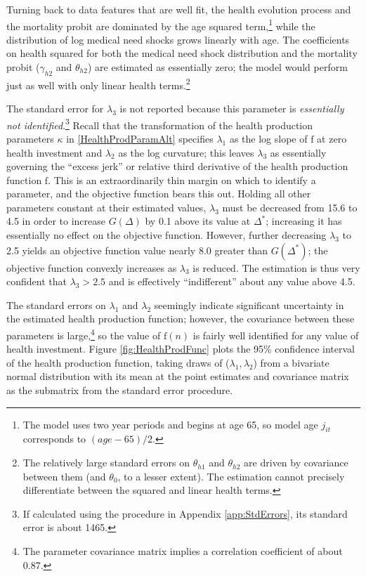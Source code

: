 \documentclass[12pt,pdftex,letterpaper]{article}
\newcommand{\Health}{h}
\newcommand{\Invst}{n}
\newcommand{\MedShkParam}{\gamma}
\newcommand{\Age}{j}
\newcommand{\MortParam}{\theta}
\newcommand{\HealthProdFunc}{\text{f}}
\newcommand{\HealthProdParam}{\kappa}
\newcommand{\HealthProdParamAlt}{\lambda}
\begin{document}
Turning back to data features that are well fit, the health evolution process and the mortality probit are dominated by the age squared term,\footnote{The model uses two year periods and begins at age 65, so model age $\Age_{it}$ corresponds to $(age - 65)/2$.} while the distribution of log medical need shocks grows linearly with age.  The coefficients on health squared for both the medical need shock distribution and the mortality probit ($\MedShkParam_{\Health 2}$ and $\MortParam_{\Health 2}$) are estimated as essentially zero; the model would perform just as well with only linear health terms.\footnote{The relatively large standard errors on $\MortParam_{\Health 1}$ and $\MortParam_{\Health 2}$ are driven by covariance between them (and $\MortParam_0$, to a lesser extent).  The estimation cannot precisely differentiate between the squared and linear health terms.}

The standard error for $\HealthProdParamAlt_3$ is not reported because this parameter is \textit{essentially not identified}.\footnote{If calculated using the procedure in Appendix \ref{app:StdErrors}, its standard error is about 1465.}  Recall that the transformation of the health production parameters $\HealthProdParam$ in \eqref{HealthProdParamAlt} specifies $\HealthProdParamAlt_1$ as the log slope of $\HealthProdFunc$ at zero health investment and $\HealthProdParamAlt_2$ as the log curvature; this leaves $\HealthProdParamAlt_3$ as essentially governing the ``excess jerk'' or relative third derivative of the health production function $\HealthProdFunc$.  This is an extraordinarily thin margin on which to identify a parameter, and the objective function bears this out. Holding all other parameters constant at their estimated values, $\HealthProdParamAlt_3$ must be decreased from 15.6 to 4.5 in order to increase $G(\Delta)$ by 0.1 above its value at $\Delta^*$; increasing it has essentially no effect on the objective function.  However, further decreasing $\HealthProdParamAlt_3$  to 2.5 yields an objective function value nearly 8.0 greater than $G(\Delta^*)$; the objective function convexly increases as $\HealthProdParamAlt_3$ is reduced.  The estimation is thus very confident that $\HealthProdParamAlt_3 > 2.5$ and is effectively ``indifferent'' about any value above 4.5.

The standard errors on $\HealthProdParamAlt_1$ and $\HealthProdParamAlt_2$ seemingly indicate significant uncertainty in the estimated health production function; however, the covariance between these parameters is large,\footnote{The parameter covariance matrix implies a correlation coefficient of about 0.87.} so the value of $\HealthProdFunc(\Invst)$ is fairly well identified for any value of health investment.  Figure \ref{fig:HealthProdFunc} plots the 95\% confidence interval of the health production function, taking draws of ($\HealthProdParamAlt_1,\HealthProdParamAlt_2$) from a bivariate normal distribution with its mean at the point estimates and covariance matrix as the submatrix from the standard error procedure.
\end{document}
